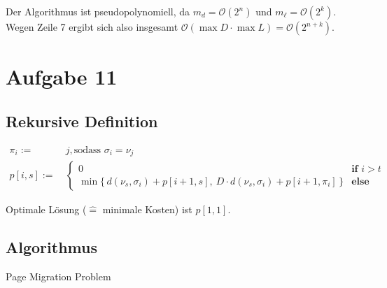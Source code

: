 Der Algorithmus ist pseudopolynomiell, da $m_d = \mathcal{O}(2^n)$ und $m_\ell = \mathcal{O}(2^k)$. \\
Wegen Zeile 7 ergibt sich also insgesamt $\mathcal{O}(\max D \cdot \max L) = \mathcal{O}(2^{n + k})$.

\section*{Aufgabe 11}
\label{sec:Aufgabe 11}

\setcounter{subsection}{0}

\subsection{Rekursive Definition}
\label{sub:Rekursive Definition}

\begin{align*}
	\pi_i := &\ j, \text{sodass } \sigma_i = \nu_j \\
	p[i, s] := &\ \begin{cases}
		0 & \textbf{if } i > t \\
		\min \{ \, d(\nu_s, \sigma_i) + p[i + 1, s],\ D \cdot d(\nu_s, \sigma_i) + p[i + 1, \pi_i] \, \} & \textbf{else}
	\end{cases}
\end{align*}

Optimale Lösung ($\hat{=}$ minimale Kosten) ist $p[1, 1]$.

\subsection{Algorithmus}
\label{sub:Algorithmus}

\begin{algorithm}
	\caption{Page Migration Problem}
	\begin{algorithmic}[1]
			 
			\EndFor\
			\Statex\
			 
				 
					\If{$\sigma_i = \nu_j$}
						\State{$\pi_i \gets j$}
					\EndIf\
				\EndFor\
				\Statex\
				 
					 
				\EndFor\
			\EndFor\
			\Statex\
		\EndFunction{}
	\end{algorithmic}
\end{algorithm}

